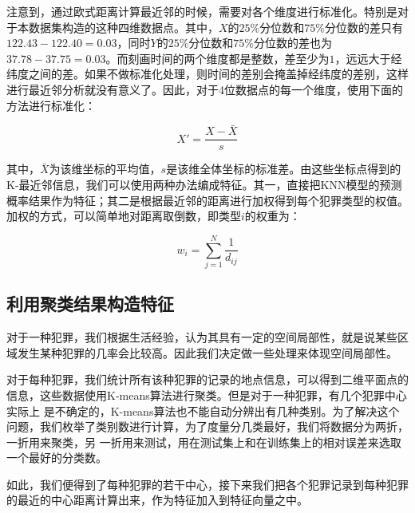 注意到，通过欧式距离计算最近邻的时候，需要对各个维度进行标准化。特别是对于本数据集构造的这种四维数据点。其中，$X$的$25\%$分位数和$75\%$分位数的差只有$122.43 - 122.40 = 0.03$，同时$Y$的$25\%$分位数和$75\%$分位数的差也为$37.78 - 37.75 = 0.03$。而刻画时间的两个维度都是整数，差至少为$1$，远远大于经纬度之间的差。如果不做标准化处理，则时间的差别会掩盖掉经纬度的差别，这样进行最近邻分析就没有意义了。因此，对于4位数据点的每一个维度，使用下面的方法进行标准化：

\begin{equation*}
    X' = \frac{X - \bar{X}}{s}
\end{equation*}

其中，$\bar{X}$为该维坐标的平均值，$s$是该维全体坐标的标准差。由这些坐标点得到的K-最近邻信息，我们可以使用两种办法编成特征。其一，直接把KNN模型的预测概率结果作为特征；其二是根据最近邻的距离进行加权得到每个犯罪类型的权值。加权的方式，可以简单地对距离取倒数，即类型$i$的权重为：

\begin{equation*}
    w_i = \sum_{j=1}^N\frac{1}{d_{ij}}
\end{equation*}

\subsection{利用聚类结果构造特征}
\label{subsec:feature5}

对于一种犯罪，我们根据生活经验，认为其具有一定的空间局部性，就是说某些区域发生某种犯罪的几率会比较高。因此我们决定做一些处理来体现空间局部性。

对于每种犯罪，我们统计所有该种犯罪的记录的地点信息，可以得到二维平面点的信息，这些数据使用K-means算法进行聚类。但是对于一种犯罪，有几个犯罪中心实际上
是不确定的，K-means算法也不能自动分辨出有几种类别。为了解决这个问题，我们枚举了类别数进行计算，为了度量分几类最好，我们将数据分为两折，一折用来聚类，另
一折用来测试，用在测试集上和在训练集上的相对误差来选取一个最好的分类数。

如此，我们便得到了每种犯罪的若干中心，接下来我们把各个犯罪记录到每种犯罪的最近的中心距离计算出来，作为特征加入到特征向量之中。
